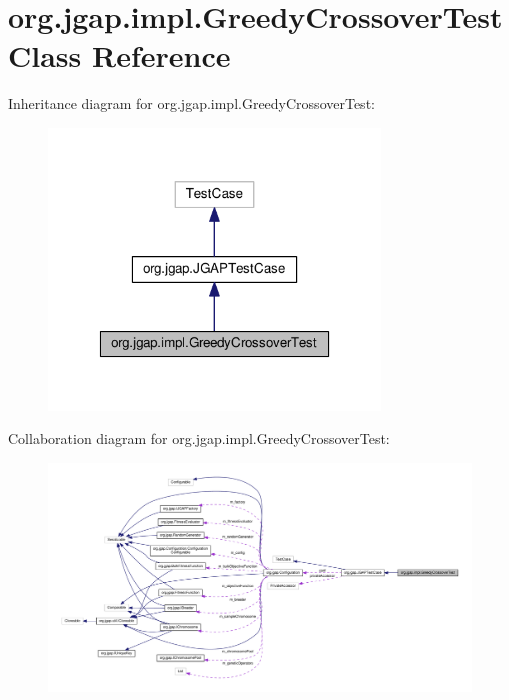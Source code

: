 \hypertarget{classorg_1_1jgap_1_1impl_1_1_greedy_crossover_test}{\section{org.\-jgap.\-impl.\-Greedy\-Crossover\-Test Class Reference}
\label{classorg_1_1jgap_1_1impl_1_1_greedy_crossover_test}
}


Inheritance diagram for org.\-jgap.\-impl.\-Greedy\-Crossover\-Test\-:
\nopagebreak
\begin{figure}[H]
\begin{center}
\leavevmode
\includegraphics[width=250pt]{classorg_1_1jgap_1_1impl_1_1_greedy_crossover_test__inherit__graph}
\end{center}
\end{figure}


Collaboration diagram for org.\-jgap.\-impl.\-Greedy\-Crossover\-Test\-:
\nopagebreak
\begin{figure}[H]
\begin{center}
\leavevmode
\includegraphics[width=350pt]{classorg_1_1jgap_1_1impl_1_1_greedy_crossover_test__coll__graph}
\end{center}
\end{figure}
